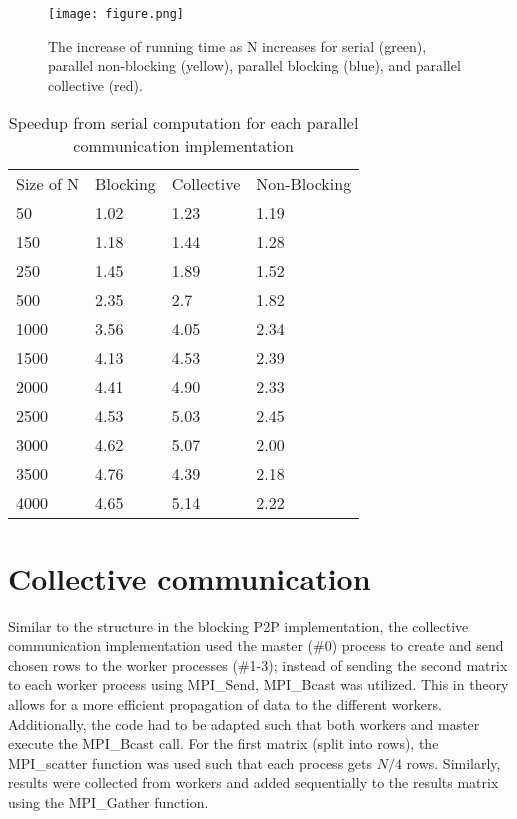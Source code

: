 \documentclass[12pt]{report}
\begin{document}
\begin{figure}
  \texttt{[image: figure.png]}
  \caption{The increase of running time as N increases for serial (green), parallel non-blocking (yellow), parallel blocking (blue), and parallel collective (red).}
  \label{fig:runtime}
\end{figure}

\begin{table}[]
\centering
\caption{Speedup from serial computation for each parallel communication implementation}
\label{table}
\begin{tabular}{llll}
Size of N                 & Blocking & Collective & Non-Blocking \\ \cline{2-4} 
\multicolumn{1}{l|}{50}   & 1.02     & 1.23       & 1.19         \\
\multicolumn{1}{l|}{150}  & 1.18     & 1.44       & 1.28         \\
\multicolumn{1}{l|}{250}  & 1.45     & 1.89       & 1.52         \\
\multicolumn{1}{l|}{500}  & 2.35     & 2.7        & 1.82         \\
\multicolumn{1}{l|}{1000} & 3.56     & 4.05       & 2.34         \\
\multicolumn{1}{l|}{1500} & 4.13     & 4.53       & 2.39         \\
\multicolumn{1}{l|}{2000} & 4.41     & 4.90       & 2.33         \\
\multicolumn{1}{l|}{2500} & 4.53     & 5.03       & 2.45         \\
\multicolumn{1}{l|}{3000} & 4.62     & 5.07       & 2.00         \\
\multicolumn{1}{l|}{3500} & 4.76     & 4.39       & 2.18         \\
\multicolumn{1}{l|}{4000} & 4.65     & 5.14       & 2.22        
\end{tabular}
\end{table}

\section{Collective communication}
Similar to the structure in the blocking P2P implementation, the collective communication implementation used the master (\#0) process to create and send chosen rows to the worker processes (\#1-3); instead of sending the second matrix to each worker process using MPI\_Send, MPI\_Bcast was utilized. This in theory allows for a more efficient propagation of data to the different workers. Additionally, the code had to be adapted such that both workers and master execute the MPI\_Bcast call. For the first matrix (split into rows), the MPI\_scatter function was used such that each process gets $N/4$ rows. Similarly, results were collected from workers and added sequentially to the results matrix using the MPI\_Gather function.  
\end{document}
